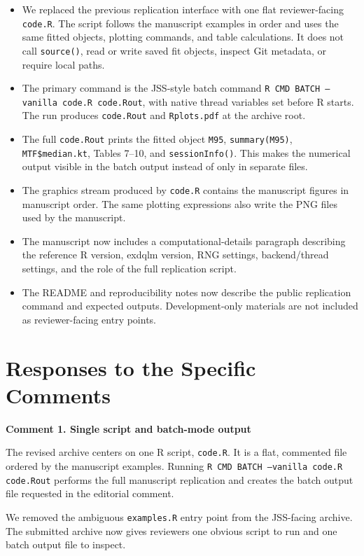 \documentclass[11pt,letterpaper]{article}
\newcommand{\pkg}[1]{\textsf{#1}}
\newcommand{\proglang}[1]{\textsf{#1}}
\newcommand{\code}[1]{\texttt{#1}}
\newcommand{\commentheading}[1]{\vspace{8pt}\noindent\textbf{Comment #1}\par}
\begin{document}
\begin{itemize}
\item We replaced the previous replication interface with one flat
  reviewer-facing \code{code.R}. The script follows the manuscript examples in
  order and uses the same fitted objects, plotting commands, and table
  calculations. It does not call \code{source()}, read or write saved fit
  objects, inspect Git metadata, or require local paths.
\item The primary command is the JSS-style batch command
  \code{R CMD BATCH --vanilla code.R code.Rout}, with native thread variables
  set before \proglang{R} starts. The run produces \code{code.Rout} and
  \code{Rplots.pdf} at the archive root.
\item The full \code{code.Rout} prints the fitted object \code{M95},
  \code{summary(M95)}, \code{MTF\$median.kt}, Tables 7--10, and
  \code{sessionInfo()}. This makes the numerical output visible in the batch
  output instead of only in separate files.
\item The graphics stream produced by \code{code.R} contains the manuscript
  figures in manuscript order. The same plotting expressions also write the PNG
  files used by the manuscript.
\item The manuscript now includes a computational-details paragraph describing
  the reference \proglang{R} version, \pkg{exdqlm} version, RNG settings,
  backend/thread settings, and the role of the full replication script.
\item The README and reproducibility notes now describe the public replication
  command and expected outputs. Development-only materials are not included as
  reviewer-facing entry points.
\end{itemize}

\section*{Responses to the Specific Comments}

\commentheading{1. Single script and batch-mode output}

The revised archive centers on one \proglang{R} script, \code{code.R}. It is a
flat, commented file ordered by the manuscript examples. Running
\code{R CMD BATCH --vanilla code.R code.Rout} performs the full manuscript
replication and creates the batch output file requested in the editorial
comment.

We removed the ambiguous \code{examples.R} entry point from the JSS-facing
archive. The submitted archive now gives reviewers one obvious script to run
and one batch output file to inspect.
\end{document}
